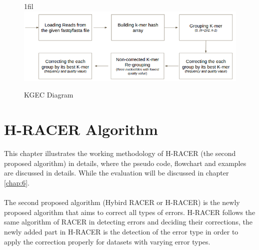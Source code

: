 \documentclass[12pt,openany]{llncs}
\makeatletter
\newcommand*{\centerfloat}{%
  \parindent \z@
  \leftskip \z@ \@plus 1fil \@minus \textwidth
  \rightskip\leftskip
  \parfillskip \z@skip}
\makeatother
\begin{document}
\begin{figure}
	\centerfloat
	\includegraphics[width=1.6\linewidth]{./figs/First-Proposal-1}
	\caption{\label{fig:fig-First-Proposal-1}KGEC Diagram}
\end{figure}

\chapter{\label{chap:5}H-RACER Algorithm}
This chapter illustrates the working methodology of H-RACER (the second proposed algorithm) in details, where the pseudo code, flowchart and examples are discussed in details. While the evaluation will be discussed in chapter \ref{chap:6}.
\\
\\
The second proposed algorithm (Hybird RACER or H-RACER) is the newly proposed algorithm that aims to correct all types of errors. H-RACER follows the same algorithm of RACER in detecting errors and deciding their corrections, the newly added part in H-RACER is the detection of the error type in order to apply the correction properly for datasets with varying error types.
\end{document}
